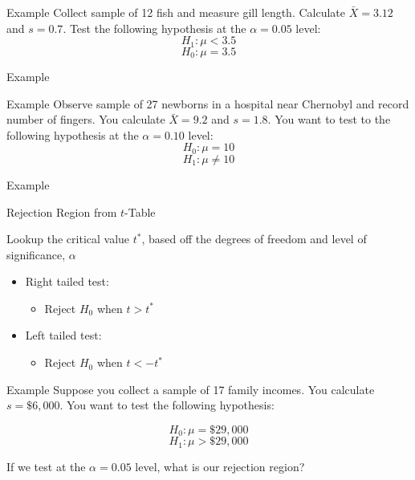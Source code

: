 \documentclass{beamer}
\begin{document}
\begin{frame}{Example} 
	Collect sample of 12 fish and measure gill length. Calculate $\bar{X} = 3.12$ and $s = 0.7$. Test the following hypothesis at the $\alpha = 0.05$ level:
	\[
		H_1:\mu<3.5
	\]
	\[
		H_0:\mu=3.5
	\]
\end{frame}

\begin{frame}{Example}
\end{frame}

\begin{frame}{Example}
	Observe sample of 27 newborns in a hospital near Chernobyl and record number of fingers. You calculate $\bar{X} = 9.2$ and $s = 1.8$. You want to test to the following hypothesis at the $\alpha=0.10$ level:
	\[
		H_0:\mu=10
	\]
	\[
		H_1:\mu \neq 10
	\]
\end{frame}

\begin{frame}{Example}
\end{frame}



\begin{frame}{Rejection Region from $t$-Table}
	
	Lookup the critical value $t^*$, based off the degrees of freedom and level of significance, $\alpha$
	
	\begin{itemize}
		\item Right tailed test:
			\begin{itemize}
		      	\item Reject $H_0$ when $t > t^*$
			\end{itemize}
		      
		\item Left tailed test:
			\begin{itemize}
		      	\item Reject $H_0$ when $t < -t^*$
			\end{itemize}	      
	\end{itemize}
	
\end{frame}


\begin{frame}{Example}
	Suppose you collect a sample of 17 family incomes. You calculate $s = \$6,000$. You want to test the following hypothesis:
	
	\[ 
		H_0: \mu=\$ 29,000
	\]
	\[ 
		H_1: \mu > \$29,000
	\]
	
	If we test at the $\alpha = 0.05$ level, what is our rejection region?
\end{frame}
\end{document}
